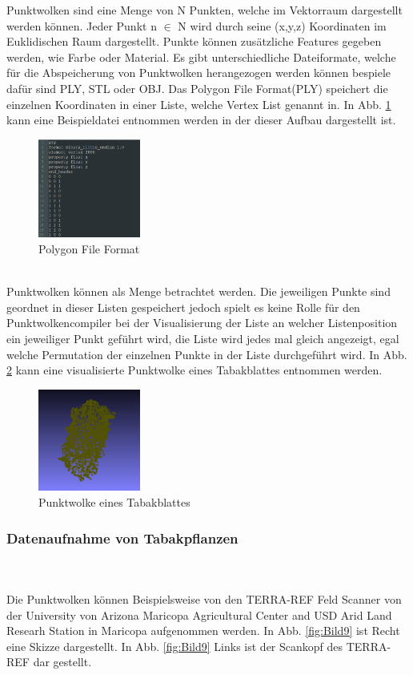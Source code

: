 \documentclass{llncs}
\begin{document}
Punktwolken sind eine Menge von N Punkten, welche im Vektorraum dargestellt werden können. Jeder Punkt n $\in$ N wird durch seine (x,y,z) Koordinaten im Euklidischen Raum dargestellt. Punkte können zusätzliche Features gegeben werden, wie Farbe oder Material. Es gibt unterschiedliche Dateiformate, welche für die Abspeicherung von Punktwolken herangezogen werden können bespiele dafür sind PLY, STL oder OBJ. Das Polygon File Format(PLY) speichert die einzelnen Koordinaten in einer Liste, welche Vertex List genannt in. In Abb. \ref{fig:Bild7} kann eine Beispieldatei entnommen werden in der dieser Aufbau dargestellt ist. 
\\
\begin{figure}[htbp] 
	\centering
	\includegraphics[width=0.3\textwidth]{plyexample.png}
	\caption{Polygon File Format}
	\label{fig:Bild7}
\end{figure}
\\
Punktwolken können als Menge betrachtet werden. Die jeweiligen Punkte sind geordnet in dieser Listen gespeichert jedoch spielt es keine Rolle für den Punktwolkencompiler bei der Visualisierung der Liste an welcher Listenposition ein jeweiliger Punkt geführt wird, die Liste wird jedes mal gleich angezeigt, egal welche Permutation der einzelnen Punkte in der Liste durchgeführt wird. In Abb. \ref{fig:Bild8} kann eine visualisierte Punktwolke eines Tabakblattes entnommen werden. 
\\
\begin{figure}[htbp] 
	\centering
	\includegraphics[width=0.3\textwidth]{leaf1.png}
	\caption{Punktwolke eines Tabakblattes}
	\label{fig:Bild8}
\end{figure}
\newpage
\subsubsection{Datenaufnahme von Tabakpflanzen}
~\\\\
Die Punktwolken können Beispielsweise von den TERRA-REF Feld Scanner von der University von Arizona Maricopa Agricultural Center and USD Arid Land Researh Station in Maricopa aufgenommen werden. In Abb. \ref{fig:Bild9} ist  Recht eine Skizze dargestellt. In Abb. \ref{fig:Bild9} Links ist der Scankopf des TERRA-REF dar gestellt. 
 
\end{document}
